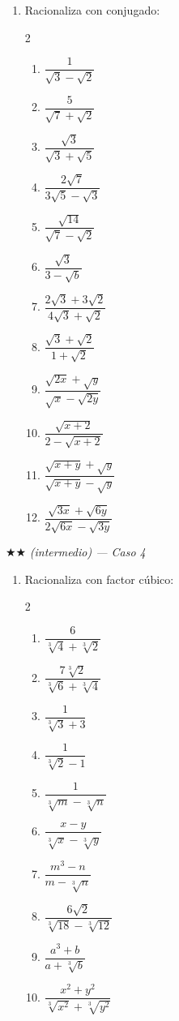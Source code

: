 \documentclass[11pt, letterpaper]{article}
\begin{document}
\begin{enumerate}[label=\textbf{\arabic*.}, leftmargin=*, resume]
  \item Racionaliza con conjugado:
  \begin{multicols}{2}
  \begin{enumerate}[label=\alph*)]
    \item $\dfrac{1}{\sqrt{3}-\sqrt{2}}$
    \item $\dfrac{5}{\sqrt{7}+\sqrt{2}}$
    \item $\dfrac{\sqrt{3}}{\sqrt{3}+\sqrt{5}}$
    \item $\dfrac{2\sqrt{7}}{3\sqrt{5}-\sqrt{3}}$
    \item $\dfrac{\sqrt{14}}{\sqrt{7}-\sqrt{2}}$
    \item $\dfrac{\sqrt{3}}{3-\sqrt{b}}$
    \item $\dfrac{2\sqrt{3}+3\sqrt{2}}{4\sqrt{3}+\sqrt{2}}$
    \item $\dfrac{\sqrt{3}+\sqrt{2}}{1+\sqrt{2}}$
    \item $\dfrac{\sqrt{2x}+\sqrt{y}}{\sqrt{x}-\sqrt{2y}}$
    \item $\dfrac{\sqrt{x+2}}{2-\sqrt{x+2}}$
    \item $\dfrac{\sqrt{x+y}+\sqrt{y}}{\sqrt{x+y}-\sqrt{y}}$
    \item $\dfrac{\sqrt{3x}+\sqrt{6y}}{2\sqrt{6x}-\sqrt{3y}}$
  \end{enumerate}
  \end{multicols}
\end{enumerate}

$\bigstar\bigstar$ \textit{(intermedio) — Caso 4}

\begin{enumerate}[label=\textbf{\arabic*.}, leftmargin=*, resume]
  \item Racionaliza con factor cúbico:
  \begin{multicols}{2}
  \begin{enumerate}[label=\alph*)]
    \item $\dfrac{6}{\sqrt[3]{4}+\sqrt[3]{2}}$
    \item $\dfrac{7\sqrt[3]{2}}{\sqrt[3]{6}+\sqrt[3]{4}}$
    \item $\dfrac{1}{\sqrt[3]{3}+3}$
    \item $\dfrac{1}{\sqrt[3]{2}-1}$
    \item $\dfrac{1}{\sqrt[3]{m}-\sqrt[3]{n}}$
    \item $\dfrac{x-y}{\sqrt[3]{x}-\sqrt[3]{y}}$
    \item $\dfrac{m^3-n}{m-\sqrt[3]{n}}$
    \item $\dfrac{6\sqrt{2}}{\sqrt[3]{18}-\sqrt[3]{12}}$
    \item $\dfrac{a^3+b}{a+\sqrt[3]{b}}$
    \item $\dfrac{x^2+y^2}{\sqrt[3]{x^2}+\sqrt[3]{y^2}}$
  \end{enumerate}
  \end{multicols}
\end{enumerate}
\end{document}
